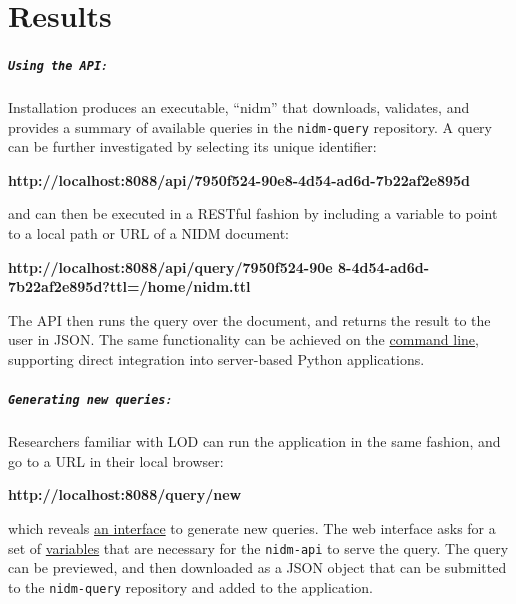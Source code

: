 \documentclass[twocolumn]{bmcart}%
\begin{document}
\section{Results}\label{results}
\subparagraph{\texorpdfstring{\texttt{Using the API}:}{:}}\label{section}
Installation produces an executable, “nidm” that downloads, validates, and provides a summary of available queries in the \texttt{nidm-query} repository. A query can be further investigated by selecting its unique identifier: \newline

\textbf{http://localhost:8088/api/7950f524-90e8-4d54-ad6d-7b22af2e895d}\newline

and can then be executed in a RESTful fashion by including a variable to point to a local path or URL of a NIDM document:\newline

\textbf{http://localhost:8088/api/query/7950f524-90e 8-4d54-ad6d-7b22af2e895d?ttl=/home/nidm.ttl}\newline

The API then runs the query over the document, and returns the result to the user in JSON. The same functionality can be achieved on the \href{http://nidm-api.readthedocs.org/en/latest/getting-started.html#integration-into-python}{command line}, supporting direct integration into server-based Python applications.\newline

\subparagraph{\texorpdfstring{\texttt{Generating new queries}:}{:}}\label{section}
Researchers familiar with LOD can run the application in the same fashion, and go to a URL in their local browser:\newline

\textbf{http://localhost:8088/query/new}\newline

which reveals \href{http://nidm-api.readthedocs.org/en/latest/development.html#web-query-generator}{an interface} to generate new queries. The web interface asks for a set of \href{http://nidm-api.readthedocs.org/en/latest/development.html#fields}{variables} that are necessary for the \texttt{nidm-api} to serve the query. The query can be previewed, and then downloaded as a JSON object that can be submitted to the \texttt{nidm-query} repository and added to the application.\newline
\end{document}
